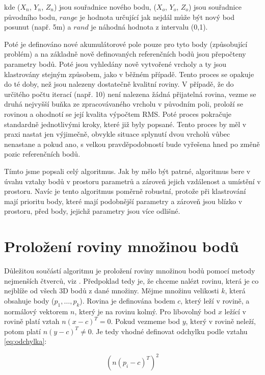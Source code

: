 \documentclass[11pt,twoside,a4paper]{book}
\begin{document}
\noindent
kde ($X_n$, $Y_n$, $Z_n$) jsou souřadnice nového bodu, ($X_o$, $Y_o$, $Z_o$) jsou souřadnice původního bodu, $range$ je hodnota určující jak nejdál může být nový bod posunut (např. 5m) a $rand$ je náhodná hodnota z intervalu (0,1).

Poté je definováno nové akumulátorové pole pouze pro tyto body (způsobující problém) a na základně nově definovaných referenčních bodů jsou přepočteny parametry bodů. Poté jsou vyhledány nově vytvořené vrcholy a ty jsou klastrovány stejným způsobem, jako v běžném případě. Tento proces se opakuje do té doby, než jsou nalezeny dostatečně kvalitní roviny. V případě, že do určitého počtu iterací (např. 10) není nalezena žádná přijatelná rovina, vezme se druhá nejvyšší buňka ze zpracovávaného vrcholu v původním poli, proloží se rovinou a ohodnotí se její kvalita výpočtem RMS. Poté proces pokračuje standardně jednotlivými kroky, které již byly popsané. Tento proces by měl v praxi nastat jen výjimečně, obvykle situace splynutí dvou vrcholů vůbec nenastane a pokud ano, s velkou pravděpodobností bude vyřešena hned po změně pozic referenčních bodů.

Tímto jsme popsali celý algoritmus. Jak by mělo být patrné, algoritmus bere v úvahu vztahy bodů v prostoru parametrů a zároveň jejich vzdálenost a umístění v prostoru. Navíc je tento algoritmus poměrně robustní, protože při klastrování mají prioritu body, které mají podobnější parametry a zároveň jsou blízko v prostoru, před body, jejichž parametry jsou více odlišné.


\section{Proložení roviny množinou bodů}
\label{sub:lsq}
Důležitou součástí algoritmu je proložení roviny množinou bodů pomocí metody nejmenších čtverců, viz \cite{wiki:leastsq}. Předpoklad tedy je, že chceme nalézt rovinu, která je co nejblíže od všech 3D bodů z dané množiny. Mějme množinu velikosti $k$, která obsahuje body ($p_1, \ldots, p_k$). Rovina je definována bodem $c$, který leží v rovině, a normálový vektorem $n$, který je na rovinu kolmý. Pro libovolný bod $x$ ležící v rovině platí vztah $n(x - c)^T = 0$. Pokud vezmeme bod $y$, který v rovině neleží, potom platí $n(y - c)^T \neq 0$. Je tedy vhodné definovat odchylku podle vztahu \ref{eq:odchylka}:

\begin{equation}
\label{eq:odchylka}
(n (p_i - c)^T)^2
\end{equation}
\end{document}
